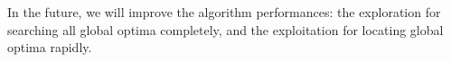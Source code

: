 \documentclass[conference]{IEEEtran}
\begin{document}
In the future, we will improve the algorithm performances: the exploration for searching all global optima completely, and the exploitation for locating global optima rapidly.




\end{document}
